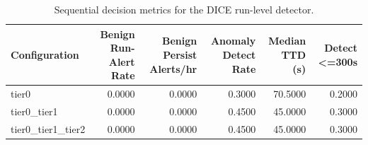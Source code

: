 \begin{table}[t]
\centering
\caption{Sequential decision metrics for the DICE run-level detector.}
\label{tab:dice_sequential_metrics}
\footnotesize
\begin{tabular}{lrrrrr}
\toprule
Configuration & Benign Run-Alert Rate & Benign Persist Alerts/hr & Anomaly Detect Rate & Median TTD (s) & Detect <=300s \\
\midrule
tier0 & 0.0000 & 0.0000 & 0.3000 & 70.5000 & 0.2000 \\
tier0_tier1 & 0.0000 & 0.0000 & 0.4500 & 45.0000 & 0.3000 \\
tier0_tier1_tier2 & 0.0000 & 0.0000 & 0.4500 & 45.0000 & 0.3000 \\
\bottomrule
\end{tabular}

\end{table}
